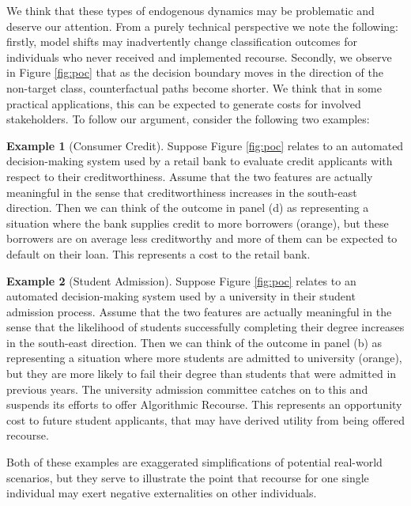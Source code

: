 \documentclass[conference,final,]{IEEEtran}
\theoremstyle{definition}
\theoremstyle{definition}
\newtheorem{example}{Example}[section]
\theoremstyle{definition}
\theoremstyle{definition}
\theoremstyle{remark}
\begin{document}
We think that these types of endogenous dynamics may be problematic and deserve our attention. From a purely technical perspective we note the following: firstly, model shifts may inadvertently change classification outcomes for individuals who never received and implemented recourse. Secondly, we observe in Figure \ref{fig:poc} that as the decision boundary moves in the direction of the non-target class, counterfactual paths become shorter. We think that in some practical applications, this can be expected to generate costs for involved stakeholders. To follow our argument, consider the following two examples:

\begin{example}[Consumer Credit]
\protect\hypertarget{exm:consumer}{}\label{exm:consumer}Suppose Figure \ref{fig:poc} relates to an automated decision-making system used by a retail bank to evaluate credit applicants with respect to their creditworthiness. Assume that the two features are actually meaningful in the sense that creditworthiness increases in the south-east direction. Then we can think of the outcome in panel (d) as representing a situation where the bank supplies credit to more borrowers (orange), but these borrowers are on average less creditworthy and more of them can be expected to default on their loan. This represents a cost to the retail bank.
\end{example}

\begin{example}[Student Admission]
\protect\hypertarget{exm:student}{}\label{exm:student}Suppose Figure \ref{fig:poc} relates to an automated decision-making system used by a university in their student admission process. Assume that the two features are actually meaningful in the sense that the likelihood of students successfully completing their degree increases in the south-east direction. Then we can think of the outcome in panel (b) as representing a situation where more students are admitted to university (orange), but they are more likely to fail their degree than students that were admitted in previous years. The university admission committee catches on to this and suspends its efforts to offer Algorithmic Recourse. This represents an opportunity cost to future student applicants, that may have derived utility from being offered recourse.
\end{example}

Both of these examples are exaggerated simplifications of potential real-world scenarios, but they serve to illustrate the point that recourse for one single individual may exert negative externalities on other individuals.
\end{document}
